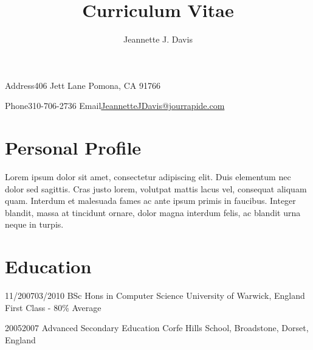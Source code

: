 \documentclass[10pt]{article} %
\title{Curriculum Vitae}
\author{Jeannette J. Davis}
\begin{document}
\makecvtitle

\begin{cvinfosection}{
  \begin{cvinfocolumn}
    {Address}{406 Jett Lane}
    {}{Pomona, CA 91766}
  \end{cvinfocolumn}
}
{
  \begin{cvinfocolumn}
    {Phone}{310-706-2736}
    {Email}{\href{mailto:JeannetteJDavis@jourrapide.com}{JeannetteJDavis@jourrapide.com}}
  \end{cvinfocolumn}
}
\end{cvinfosection}

\section*{Personal Profile}

Lorem ipsum dolor sit amet, consectetur adipiscing elit. Duis elementum nec dolor sed sagittis. Cras justo lorem, volutpat mattis lacus vel, consequat aliquam quam. Interdum et malesuada fames ac ante ipsum primis in faucibus. Integer blandit, massa at tincidunt ornare, dolor magna interdum felis, ac blandit urna neque in turpis.




\section*{Education}

\begin{education}
  {11/2007}{03/2010}
  {BSc Hons in Computer Science}
  {University of Warwick, England}
  {First Class - 80\% Average}
\end{education}


\begin{education}
  {2005}{2007}
  {Advanced Secondary Education}
  {Corfe Hills School, Broadstone, Dorset, England}
  {}
\end{education}

\end{document}
